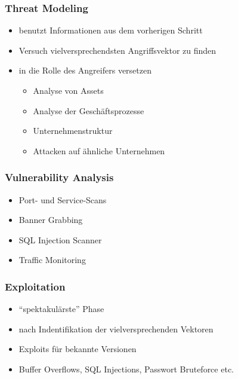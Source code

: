 \documentclass[11pt]{beamer}
\begin{document}
\begin{frame}[fragile]\frametitle{Threat Modeling}
\label{sec-2-3}
\begin{itemize}

\item benutzt Informationen aus dem vorherigen Schritt\\
\label{sec-2-3-1}%
\item Versuch vielversprechendsten Angriffsvektor zu finden\\
\label{sec-2-3-2}%
\item in die Rolle des Angreifers versetzen
\label{sec-2-3-3}%
\begin{itemize}

\item Analyse von Assets\\
\label{sec-2-3-3-1}%
\item Analyse der Geschäftsprozesse\\
\label{sec-2-3-3-2}%
\item Unternehmenstruktur\\
\label{sec-2-3-3-3}%
\item Attacken auf ähnliche Unternehmen\\
\label{sec-2-3-3-4}%
\end{itemize} %
\end{itemize} %
\end{frame}
\begin{frame}[fragile]\frametitle{Vulnerability Analysis}
\label{sec-2-4}
\begin{itemize}

\item Port- und Service-Scans\\
\label{sec-2-4-1}%
\item Banner Grabbing\\
\label{sec-2-4-2}%
\item SQL Injection Scanner\\
\label{sec-2-4-3}%
\item Traffic Monitoring\\
\label{sec-2-4-4}%
\end{itemize} %
\end{frame}
\begin{frame}[fragile]\frametitle{Exploitation}
\label{sec-2-5}
\begin{itemize}

\item ``spektakulärste'' Phase\\
\label{sec-2-5-1}%
\item nach Indentifikation der vielversprechenden Vektoren\\
\label{sec-2-5-2}%
\item Exploits für bekannte Versionen\\
\label{sec-2-5-3}%
\item Buffer Overflows, SQL Injections, Passwort Bruteforce etc.\\
\label{sec-2-5-4}%
\end{itemize} %
\end{frame}
\end{document}
